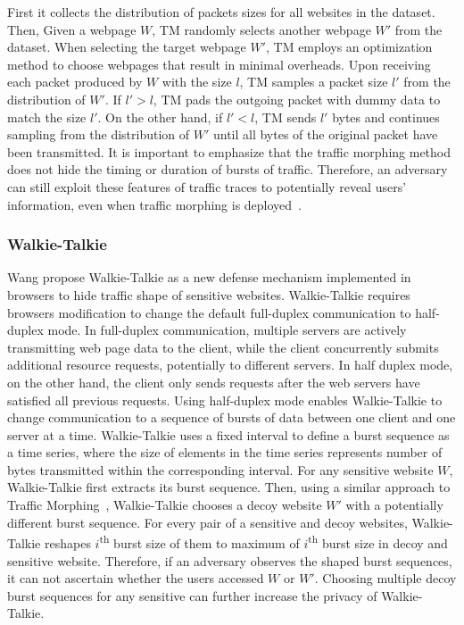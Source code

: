 First it collects the distribution of packets sizes for all websites in the dataset.
Then, Given a webpage $W$, TM randomly selects another webpage $W'$ from the dataset.
When selecting the target webpage $W'$, TM employs an optimization method to choose webpages that result in minimal overheads. 
Upon receiving each packet produced by $W$ with the size $l$, TM samples a packet size $l'$ from the distribution of $W'$. 
If $l' > l$, TM pads the outgoing packet with dummy data to match the size $l'$. 
On the other hand, if $l' < l$, TM sends $l'$ bytes and continues sampling from the distribution of $W'$ until all bytes of the original packet have been transmitted.
It is important to emphasize that the traffic morphing method does not hide the timing or duration of bursts of traffic.
Therefore, an adversary can still exploit these features of traffic traces to potentially reveal users' information, even when traffic morphing is deployed~\cite{dyer2012peek}.


\subsubsection{Walkie-Talkie}\label{subsubsec:walkie-talkie}
Wang propose {Walkie-Talkie} as a new defense mechanism implemented in browsers to hide traffic shape of sensitive websites.
{Walkie-Talkie} requires browsers modification to change the default full-duplex communication to half-duplex mode.
In full-duplex communication, multiple servers are actively transmitting web page data to the client, while the client concurrently submits additional resource requests, potentially to different servers.
In half duplex mode, on the other hand, the client only sends requests after the web servers have satisfied all previous requests.
Using half-duplex mode enables {Walkie-Talkie} to change communication to a sequence of bursts of data between one client and one server at a time.
Walkie-Talkie uses a fixed interval to define a burst sequence as a time series, where the size of elements in the time series represents number of bytes transmitted within the corresponding interval.
For any sensitive website $W$, {Walkie-Talkie} first extracts its burst sequence.  
Then, using a similar approach to Traffic Morphing~\cite{wright2009traffic}, {Walkie-Talkie} chooses a decoy website $W'$ with a potentially different burst sequence.
For every pair of a sensitive and decoy websites, Walkie-Talkie reshapes $i$\textsuperscript{th} burst size of them to maximum of $i$\textsuperscript{th} burst size in decoy and sensitive website. 
Therefore, if an adversary observes the shaped burst sequences, it can not ascertain whether the users accessed $W$ or $W'$.  
Choosing multiple decoy burst sequences for any sensitive can further increase the privacy of {Walkie-Talkie}.

